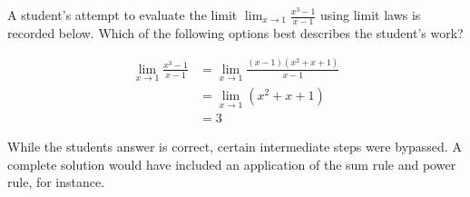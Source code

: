 \documentclass{ximera}
\author{Steven Gubkin}
\begin{document}
\begin{exercise}

	A student's attempt to evaluate the limit $\lim_{x \to 1} \frac{x^3-1}{x-1}$ using limit laws is recorded below.  Which of the following options best describes the student's work?
	
	\begin{align*}
		\lim_{x \to 1} \frac{x^3-1}{x-1} &= \lim_{x \to 1} \frac{(x-1)(x^2+x+1)}{x-1}\\
		&= \lim_{x \to 1} \left( x^2 + x + 1\right)\\
		&= 3
	\end{align*}
	
	\begin{multipleChoice}
	\end{multipleChoice}
	
	\begin{feedback}
		While the students answer is correct, certain intermediate steps were bypassed.   A complete solution would have included an application of the sum rule and power rule, for instance.
	\end{feedback}
	
\end{exercise}
\end{document}
